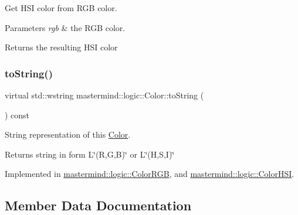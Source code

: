 Get H\+SI color from R\+GB color. 
\begin{DoxyParams}{Parameters}
{\em rgb} & the R\+GB color. \\
\hline
\end{DoxyParams}
\begin{DoxyReturn}{Returns}
the resulting H\+SI color 
\end{DoxyReturn}
\hypertarget{classmastermind_1_1logic_1_1_color_ab911e1ca9d820b7d97c8e014ff75bc49}{}\label{classmastermind_1_1logic_1_1_color_ab911e1ca9d820b7d97c8e014ff75bc49} 
\subsubsection{\texorpdfstring{to\+String()}{toString()}}
{\footnotesize\ttfamily virtual std\+::wstring mastermind\+::logic\+::\+Color\+::to\+String (\begin{DoxyParamCaption}{ }\end{DoxyParamCaption}) const\hspace{0.3cm}{\ttfamily [pure virtual]}}



String representation of this \hyperlink{classmastermind_1_1logic_1_1_color}{Color}. 

\begin{DoxyReturn}{Returns}
string in form {\ttfamily L\char`\"{}(\+R,\+G,\+B)\char`\"{}} or {\ttfamily L\char`\"{}(\+H,\+S,\+I)\char`\"{}} 
\end{DoxyReturn}


Implemented in \hyperlink{classmastermind_1_1logic_1_1_color_r_g_b_ab80986e7ab151d26d47ad28d153a6a88}{mastermind\+::logic\+::\+Color\+R\+GB}, and \hyperlink{classmastermind_1_1logic_1_1_color_h_s_i_a2cba1eccd441e55eef75639c2cf9433c}{mastermind\+::logic\+::\+Color\+H\+SI}.



\subsection{Member Data Documentation}
\hypertarget{classmastermind_1_1logic_1_1_color_aa086b665d9a43db3acbd43ed7f4d31ba}{}\label{classmastermind_1_1logic_1_1_color_aa086b665d9a43db3acbd43ed7f4d31ba} 
